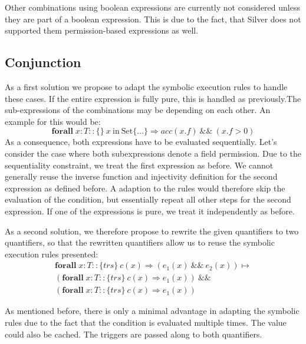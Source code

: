\documentclass[12pt]{article}
\begin{document}
Other combinations using boolean expressions are currently not considered unless they are part of a boolean expression. This is due to the fact, that Silver does not supported them permission-based expressions as well.

\subsection{Conjunction}
As a first solution we propose to adapt the symbolic execution rules to handle these cases.
If the entire expression is fully pure, this is handled as previously.The sub-expressions of the combinations may be depending on each other. An example for this would be: 
\begin{equation}
\label{eq1}
	\mathbf{forall} \; x:T :: \{\}\  x\ \mathrm{in \ Set} \{\dots\} \Rightarrow acc(x.f) \ \&\& \ (x.f > 0)
\end{equation}
As a consequence, both expressions have to be evaluated sequentially. 
Let's consider the case where both subexpressions denote a field permission. Due to the sequentiality constraint, we treat the first expression as before. We cannot generally reuse the inverse function and injectivity definition for the second expression as defined before. A adaption to the rules would therefore skip the evaluation of the condition, but essentially repeat all other steps for the second expression.
If one of the expressions is pure, we treat it independently as before.

As a second solution, we therefore propose to rewrite the given quantifiers to two quantifiers, so that the rewritten quantifiers allow us to reuse the symbolic execution rules presented: 
\begin{equation}
\begin{aligned}
	\mathbf{forall} \; x:T :: \{trs\}\  c(x) \Rightarrow (e_1(x)\ \&\& \ e_2(x))  \mapsto \\
	(\mathbf{forall} \; x:T :: \{trs\}\   c(x)  \Rightarrow e_1(x)) \ \&\& \\
	(\mathbf{forall} \; x:T :: \{trs\}\   c(x) \Rightarrow  e_1(x))
\end{aligned}
\end{equation}

As mentioned before, there is only a minimal advantage in adapting the symbolic rules due to the fact that the condition is evaluated multiple times. The value could also be cached. The triggers are passed along to both quantifiers.
\end{document}
